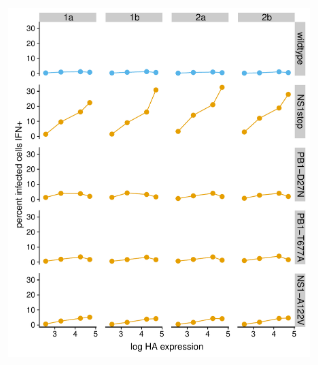 \documentclass[lineno]{asm-article}
\newcommand{\FIG}[1]{\autoref{fig:#1}}
\newcommand{\SUPPFIG}[1]{\autoref{suppfig:#1}}
\begin{document}
\begin{suppfig}
\centerline{
\includegraphics[width=0.6\textwidth, valign=t]{figures/MutantComparison/p_ifn_vs_ha.pdf}
}
\caption{
A more detailed version of the data summarized in \FIG{IFN_vs_HA}.
For each virus and replicate, we binned the infected cells in \SUPPFIG{validationflow} into HA expression quartiles based on the flow cytometry measurements.
We then calculated the percent of cells that were IFN+ in each quartile.
The plots show the mean HA expression of the quartile versus the precent of cells that are IFN+.
The results clearly show that for the NS1stop and to a lesser extent the NS1-A122V variants, more viral protein (higher HA signal) correlates with IFN induction.
\FIG{IFN_vs_HA} summarizes these same data by simply showing the ratio of percent IFN+ between the highest and lowest quartile.
}
\label{suppfig:IFN_vs_HA}
\end{suppfig}

\clearpage

\begin{suppfile}
\caption{
Sequences of the IFN reporters in \FIG{IFNrare}A are at \url{https://github.com/jbloomlab/IFNsorted_flu_single_cell/tree/master/paper/figures/IFN_stochastic/IFN_reporter/plasmids}.
}
\label{suppfile:reporter_sequences}
\end{suppfile}

\begin{suppfile}
\caption{
Genbank files giving sequences of the wild-type and synonymously barcoded viruses are at \url{https://github.com/jbloomlab/IFNsorted_flu_single_cell/blob/master/data/flu_sequences/flu-wsn.gb} and \url{https://github.com/jbloomlab/IFNsorted_flu_single_cell/blob/master/data/flu_sequences/flu-wsn-double-syn.gb}.
}
\label{suppfile:virus_seqs}
\end{suppfile}
\end{document}
